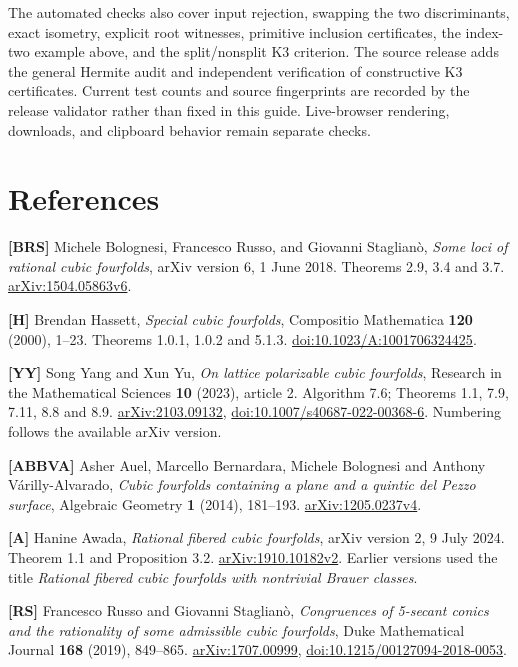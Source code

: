 \documentclass[
  american,
  11pt,
  a4paper,
]{article}
\begin{document}
The automated checks also cover input rejection, swapping the two
discriminants, exact isometry, explicit root witnesses, primitive
inclusion certificates, the index-two example above, and the
split/nonsplit K3 criterion. The source release adds the general Hermite
audit and independent verification of constructive K3 certificates.
Current test counts and source fingerprints are recorded by the release
validator rather than fixed in this guide. Live-browser rendering,
downloads, and clipboard behavior remain separate checks.

\clearpage
\section{References}\label{references}

\textbf{{[}BRS{]}} Michele Bolognesi, Francesco Russo, and Giovanni
Staglianò, \emph{Some loci of rational cubic fourfolds}, arXiv version
6, 1 June 2018. Theorems 2.9, 3.4 and 3.7.
\href{https://arxiv.org/abs/1504.05863v6}{arXiv:1504.05863v6}.

\textbf{{[}H{]}} Brendan Hassett, \emph{Special cubic fourfolds},
Compositio Mathematica \textbf{120} (2000), 1--23. Theorems 1.0.1, 1.0.2
and 5.1.3.
\href{https://doi.org/10.1023/A:1001706324425}{doi:10.1023/A:1001706324425}.

\textbf{{[}YY{]}} Song Yang and Xun Yu, \emph{On lattice polarizable
cubic fourfolds}, Research in the Mathematical Sciences \textbf{10}
(2023), article 2. Algorithm 7.6; Theorems 1.1, 7.9, 7.11, 8.8 and 8.9.
\href{https://arxiv.org/abs/2103.09132}{arXiv:2103.09132},
\href{https://doi.org/10.1007/s40687-022-00368-6}{doi:10.1007/s40687-022-00368-6}.
Numbering follows the available arXiv version.

\textbf{{[}ABBVA{]}} Asher Auel, Marcello Bernardara, Michele Bolognesi
and Anthony Várilly-Alvarado, \emph{Cubic fourfolds containing a plane
and a quintic del Pezzo surface}, Algebraic Geometry \textbf{1} (2014),
181--193. \href{https://arxiv.org/abs/1205.0237v4}{arXiv:1205.0237v4}.

\textbf{{[}A{]}} Hanine Awada, \emph{Rational fibered cubic fourfolds},
arXiv version 2, 9 July 2024. Theorem 1.1 and Proposition 3.2.
\href{https://arxiv.org/abs/1910.10182v2}{arXiv:1910.10182v2}. Earlier
versions used the title \emph{Rational fibered cubic fourfolds with
nontrivial Brauer classes}.

\textbf{{[}RS{]}} Francesco Russo and Giovanni Staglianò,
\emph{Congruences of 5-secant conics and the rationality of some
admissible cubic fourfolds}, Duke Mathematical Journal \textbf{168}
(2019), 849--865.
\href{https://arxiv.org/abs/1707.00999}{arXiv:1707.00999},
\href{https://doi.org/10.1215/00127094-2018-0053}{doi:10.1215/00127094-2018-0053}.
\end{document}

